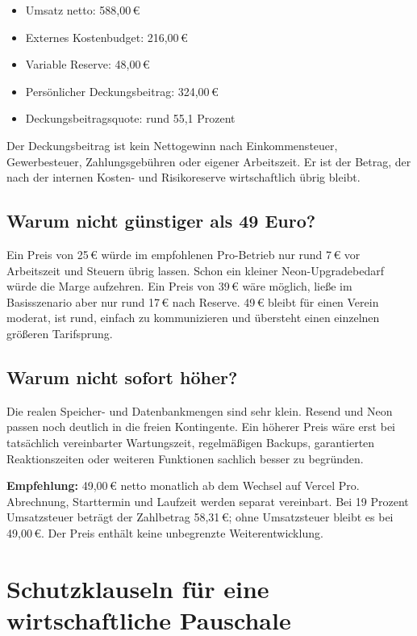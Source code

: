 \documentclass[11pt,a4paper]{article}
\newcommand{\eur}[1]{#1\,€}
\begin{document}
\begin{itemize}
  \item Umsatz netto: \eur{588,00}
  \item Externes Kostenbudget: \eur{216,00}
  \item Variable Reserve: \eur{48,00}
  \item Persönlicher Deckungsbeitrag: \eur{324,00}
  \item Deckungsbeitragsquote: rund 55,1 Prozent
\end{itemize}

Der Deckungsbeitrag ist kein Nettogewinn nach Einkommensteuer, Gewerbesteuer, Zahlungsgebühren oder eigener Arbeitszeit. Er ist der Betrag, der nach der internen Kosten- und Risikoreserve wirtschaftlich übrig bleibt.

\subsection{Warum nicht günstiger als 49 Euro?}

Ein Preis von \eur{25} würde im empfohlenen Pro-Betrieb nur rund \eur{7} vor Arbeitszeit und Steuern übrig lassen. Schon ein kleiner Neon-Upgradebedarf würde die Marge aufzehren. Ein Preis von \eur{39} wäre möglich, ließe im Basisszenario aber nur rund \eur{17} nach Reserve. \eur{49} bleibt für einen Verein moderat, ist rund, einfach zu kommunizieren und übersteht einen einzelnen größeren Tarifsprung.

\subsection{Warum nicht sofort höher?}

Die realen Speicher- und Datenbankmengen sind sehr klein. Resend und Neon passen noch deutlich in die freien Kontingente. Ein höherer Preis wäre erst bei tatsächlich vereinbarter Wartungszeit, regelmäßigen Backups, garantierten Reaktionszeiten oder weiteren Funktionen sachlich besser zu begründen.

\begin{decisionbox}
  \textbf{Empfehlung:} \eur{49,00} netto monatlich ab dem Wechsel auf Vercel Pro. Abrechnung, Starttermin und Laufzeit werden separat vereinbart. Bei 19 Prozent Umsatzsteuer beträgt der Zahlbetrag \eur{58,31}; ohne Umsatzsteuer bleibt es bei \eur{49,00}. Der Preis enthält keine unbegrenzte Weiterentwicklung.
\end{decisionbox}

\section{Schutzklauseln für eine wirtschaftliche Pauschale}
\end{document}
